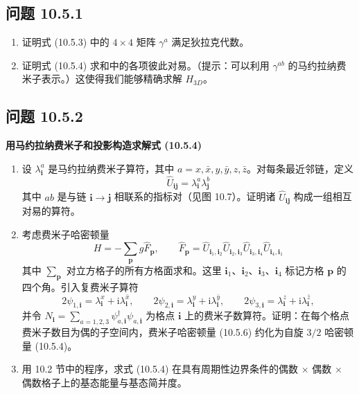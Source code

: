 \subsection*{问题 10.5.1}

\begin{enumerate}
\item 证明式 (10.5.3) 中的 $4\times4$ 矩阵 $\gamma^{a}$ 满足狄拉克代数。
\item 证明式 (10.5.4) 求和中的各项彼此对易。（提示：可以利用 $\gamma^{ab}$ 的马约拉纳费米子表示。）这使得我们能够精确求解 $H_{3D}$。
\end{enumerate}

\subsection*{问题 10.5.2}

\textbf{用马约拉纳费米子和投影构造求解式 (10.5.4)}

\begin{enumerate}
\item 设 $\lambda_{\pmb{i}}^{a}$ 是马约拉纳费米子算符，其中 $a=x,\bar{x},y,\bar{y},z,\bar{z}$。对每条最近邻链，定义
\begin{equation*}
\hat U_{\pmb{i}\pmb{j}}=\lambda_{\pmb{i}}^{a}\lambda_{\pmb{j}}^{b} \tag{10.5.5}
\end{equation*}
其中 $ab$ 是与链 $\pmb{i}\to\pmb{j}$ 相联系的指标对（见图 10.7）。证明诸 $\hat U_{\pmb{i}\pmb{j}}$ 构成一组相互对易的算符。
\item 考虑费米子哈密顿量
\begin{equation*}
H=-\sum_{\pmb{p}}g\hat F_{\pmb{p}}, \qquad \hat F_{\pmb{p}}=\hat U_{\pmb{i}_1,\pmb{i}_2}\hat U_{\pmb{i}_2,\pmb{i}_3}\hat U_{\pmb{i}_3,\pmb{i}_4}\hat U_{\pmb{i}_4,\pmb{i}_1} \tag{10.5.6}
\end{equation*}
其中 $\sum_{\pmb{p}}$ 对立方格子的所有方格面求和。这里 $\pmb{i}_1$、$\pmb{i}_2$、$\pmb{i}_3$、$\pmb{i}_4$ 标记方格 $\pmb{p}$ 的四个角。引入复费米子算符
\begin{equation*}
2\psi_{1,\pmb{i}}=\lambda_{\pmb{i}}^{x}+\mathrm{i}\lambda_{\pmb{i}}^{\bar{x}}, \qquad 2\psi_{2,\pmb{i}}=\lambda_{\pmb{i}}^{y}+\mathrm{i}\lambda_{\pmb{i}}^{\bar{y}}, \qquad 2\psi_{3,\pmb{i}}=\lambda_{\pmb{i}}^{z}+\mathrm{i}\lambda_{\pmb{i}}^{\bar{z}},
\end{equation*}
并令 $N_{\pmb{i}}=\sum_{a=1,2,3}\psi_{a,\pmb{i}}^{\dagger}\psi_{a,\pmb{i}}$ 为格点 $\pmb{i}$ 上的费米子数算符。证明：在每个格点费米子数目为偶的子空间内，费米子哈密顿量 (10.5.6) 约化为自旋 $3/2$ 哈密顿量 (10.5.4)。
\item 用 10.2 节中的程序，求式 (10.5.4) 在具有周期性边界条件的偶数 $\times$ 偶数 $\times$ 偶数格子上的基态能量与基态简并度。
\end{enumerate}

